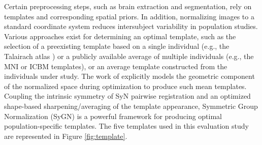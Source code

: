 Certain preprocessing steps, such as brain extraction and
segmentation, rely on templates and corresponding spatial priors. 
In addition, normalizing images to a standard coordinate system
reduces intersubject variability in population studies.  Various
approaches exist for determining an optimal template,
such as the selection of a preexisting template based on a single individual
(e.g., the Talairach atlas \citep{Talairach1988}) or a publicly available average of multiple individuals
(e.g., the MNI \citep{Collins1994} or ICBM \citep{Mazziotta1995}
templates), or an average template constructed from the individuals under study.
The work of \cite{avants2010} explicitly models the geometric component of the 
normalized space during optimization to produce such mean templates.  Coupling the intrinsic symmetry of 
SyN pairwise registration \citep{avants2011} and an
optimized shape-based sharpening/averaging of the template appearance, Symmetric Group Normalization (SyGN) is a powerful framework for producing optimal population-specific templates. The five templates used in this evaluation
study are represented in Figure \ref{fig:template}.


